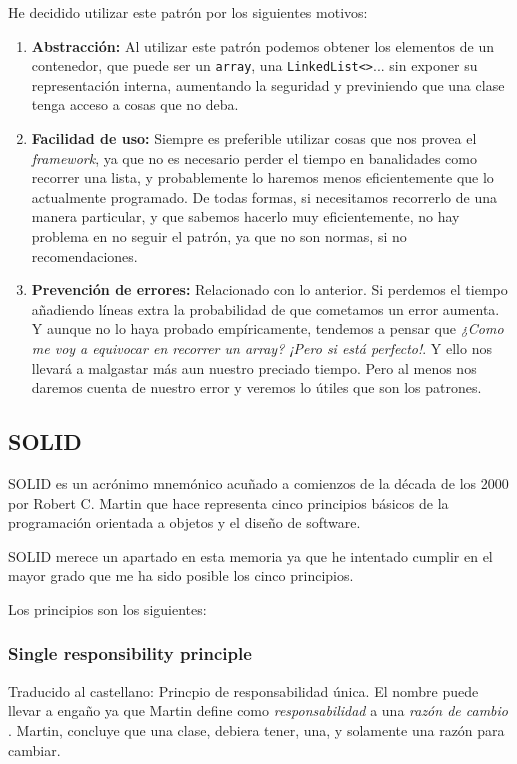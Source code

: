 He decidido utilizar este patr\'{o}n por los siguientes motivos:
\begin{enumerate}
    \item \textbf{Abstracci\'{o}n:}
    Al utilizar este patr\'{o}n podemos obtener los elementos de un contenedor, que puede ser un \texttt{array}, una \texttt{LinkedList<>}... sin
    exponer su representaci\'{o}n interna, aumentando la seguridad y previniendo que una clase tenga acceso a cosas que no deba.
    
    \item \textbf{Facilidad de uso:}
    Siempre es preferible utilizar cosas que nos provea el \emph{framework}, ya que no es necesario perder el tiempo en banalidades como 
    recorrer una lista, y probablemente lo haremos menos eficientemente que lo actualmente programado. De todas formas, si necesitamos
    recorrerlo de una manera particular, y que sabemos hacerlo muy eficientemente, no hay problema en no seguir el patr\'{o}n, ya que no son
    normas, si no recomendaciones.
    
    \item \textbf{Prevenci\'{o}n de errores:}
    Relacionado con lo anterior. Si perdemos el tiempo a\~{n}adiendo l\'{i}neas extra la probabilidad de que cometamos un error aumenta. Y aunque
    no lo haya probado emp\'{i}ricamente, tendemos a pensar que \emph{¿Como me voy a equivocar en recorrer un array? ¡Pero si est\'{a} perfecto!}. 
    Y ello nos llevar\'{a} a malgastar m\'{a}s aun nuestro preciado tiempo. Pero al menos nos daremos cuenta de nuestro error y veremos lo
    \'{u}tiles que son los patrones.
\end{enumerate}

\subsection{SOLID}
SOLID es un acr\'{o}nimo mnem\'{o}nico acu\~{n}ado a comienzos de la d\'{e}cada de los 2000 por Robert C. Martin \cite{SOLID:ADefinition}
que hace representa cinco principios b\'{a}sicos de la programaci\'{o}n orientada a objetos y el dise\~{n}o de software.

SOLID merece un apartado en esta memoria ya que he intentado cumplir en el mayor grado que me ha sido posible los cinco principios.

Los principios son los siguientes:
\subsubsection{Single responsibility principle}
Traducido al castellano: Princpio de responsabilidad \'{u}nica. El nombre puede llevar a enga\~{n}o ya que Martin define como \emph{responsabilidad}
a una \emph{raz\'{o}n de cambio} \cite{brunetti-JMMM-2002}. Martin, concluye que una clase, debiera tener, una, y solamente una raz\'{o}n para cambiar.

